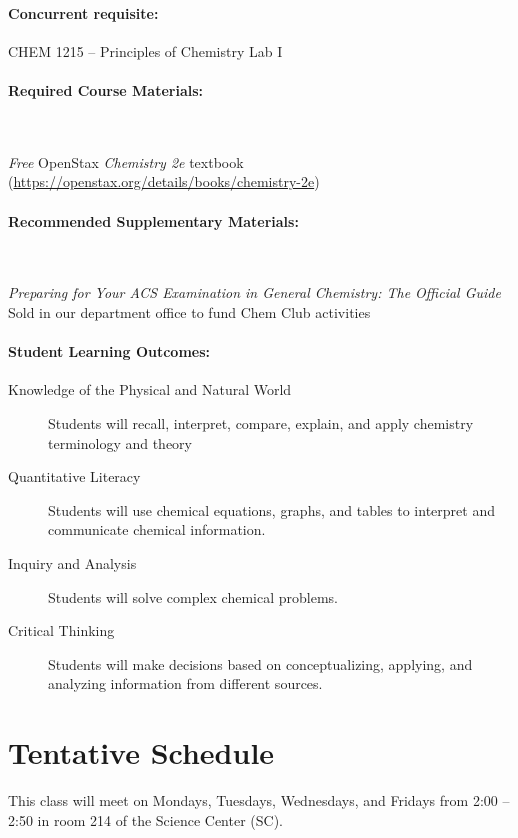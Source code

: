 \documentclass[12pt, letterpaper]{article}
\begin{document}
\paragraph{Concurrent requisite:}
CHEM 1215 -- Principles of Chemistry Lab I

\paragraph{Required Course Materials:} ~

\emph{Free} OpenStax \emph{Chemistry 2e} textbook (\href{https://openstax.org/details/books/chemistry-2e}{https://openstax.org/details/books/chemistry-2e})

\paragraph{Recommended Supplementary Materials:} ~

\emph{Preparing for Your ACS Examination in General Chemistry: The Official Guide} Sold in our department office to fund Chem Club activities

\paragraph{Student Learning Outcomes:}
\begin{description}
	\item[Knowledge of the Physical and Natural World] Students will recall, interpret, compare, explain, and apply chemistry terminology and theory
	\item[Quantitative Literacy] Students will use chemical equations, graphs, and tables to interpret and communicate chemical information.
	\item[Inquiry and Analysis] Students will solve complex chemical problems.
	\item[Critical Thinking] Students will make decisions based on conceptualizing, applying, and analyzing information from different sources.
\end{description}

\section*{Tentative Schedule}
This class will meet on Mondays, Tuesdays, Wednesdays, and Fridays from 2:00 -- 2:50 in room 214 of the Science Center (SC).

\end{document}
